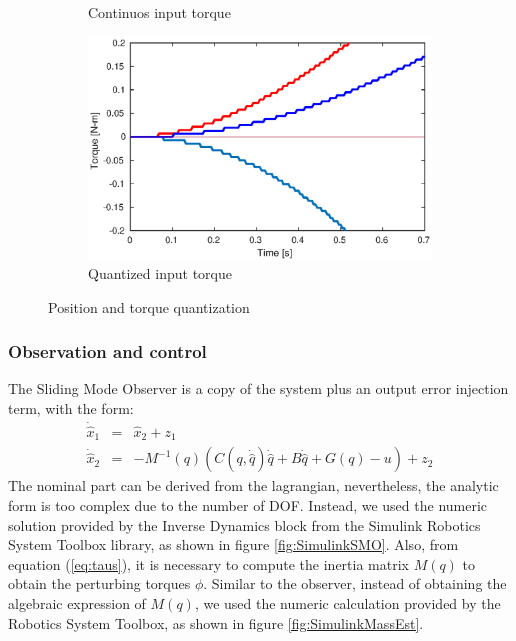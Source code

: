 \documentclass[a4paper, 10pt]{article}
\begin{document}
\begin{figure}[h!]
\begin{subfigure}[b]{0.4\textwidth}
    \caption{Continuos input torque}
    \label{fig:torque_quantized1}
  \end{subfigure}
  \begin{subfigure}[b]{0.4\textwidth}
    \centering
    \includegraphics[width=\textwidth]{Figures/torque_quantized2.eps}
    \caption{Quantized input torque}
    \label{fig:torque_quantized2}
  \end{subfigure}
  \caption{Position and torque quantization}
  \label{fig:quantization}
\end{figure}

\subsubsection*{Observation and control}
The Sliding Mode Observer is a copy of the system plus an output error injection term, with the form:
\begin{eqnarray}
  \dot{\hat{x}}_1 &=& \hat{x}_2 + z_1\label{eq:observer1}\\
  \dot{\hat{x}}_2 &=& -M^{-1}(q)\left(C(q, \dot{\hat{q}})\dot{\hat{q}} + B\dot{\hat{q}} + G(q) - u\right) + z_2\label{eq:observer2}
\end{eqnarray}
  The nominal part can be derived from the lagrangian, nevertheless, the analytic form is too complex due to the number of DOF. Instead, we used the numeric solution provided by the Inverse Dynamics block from the Simulink Robotics System Toolbox library, as shown in figure \ref{fig:SimulinkSMO}. Also, from equation (\ref{eq:taus}), it is necessary to compute the inertia matrix $M(q)$ to obtain the perturbing torques $\phi$. Similar to the observer, instead of obtaining the algebraic expression of $M(q)$, we used the numeric calculation provided by the Robotics System Toolbox, as shown in figure \ref{fig:SimulinkMassEst}.
\end{document}
